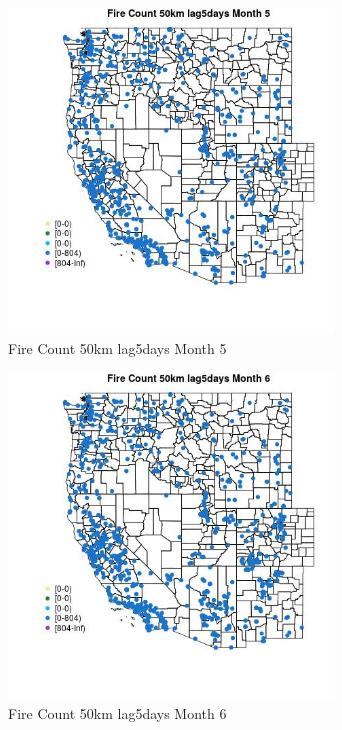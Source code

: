 \begin{figure} 
\centering  
\includegraphics[width=0.77\textwidth]{Code_Outputs/Report_ML_input_PM25_Step4_part_f_de_duplicated_aves_prioritize_24hr_obswNAs_MapObsMo5Fire_Count_50km_lag5days.jpg} 
\caption{\label{fig:Report_ML_input_PM25_Step4_part_f_de_duplicated_aves_prioritize_24hr_obswNAsMapObsMo5Fire_Count_50km_lag5days}Fire Count 50km lag5days Month 5} 
\end{figure} 
 

\clearpage 

\begin{figure} 
\centering  
\includegraphics[width=0.77\textwidth]{Code_Outputs/Report_ML_input_PM25_Step4_part_f_de_duplicated_aves_prioritize_24hr_obswNAs_MapObsMo6Fire_Count_50km_lag5days.jpg} 
\caption{\label{fig:Report_ML_input_PM25_Step4_part_f_de_duplicated_aves_prioritize_24hr_obswNAsMapObsMo6Fire_Count_50km_lag5days}Fire Count 50km lag5days Month 6} 
\end{figure} 
 

